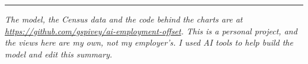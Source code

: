 \documentclass[11pt]{article}
\begin{document}
\vspace{1em}
\hrule
\vspace{0.5em}
\small\emph{The model, the Census data and the code behind the charts are at \url{https://github.com/gspivey/ai-employment-offset}. This is a personal project, and the views here are my own, not my employer's. I used AI tools to help build the model and edit this summary.}
\end{document}
